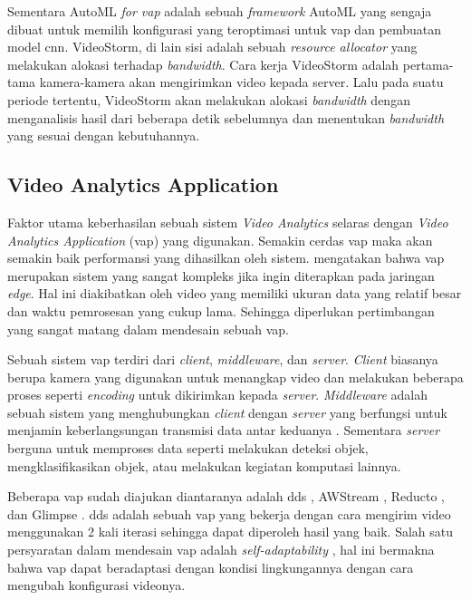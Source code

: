     Sementara AutoML \textit{for \gls{vap}} adalah sebuah \textit{framework} AutoML yang sengaja dibuat untuk memilih konfigurasi yang teroptimasi untuk \gls{vap} dan pembuatan model \gls{cnn}. VideoStorm, di lain sisi
    adalah sebuah \textit{resource allocator} yang melakukan alokasi terhadap \textit{bandwidth}. Cara kerja VideoStorm adalah pertama-tama kamera-kamera akan mengirimkan video kepada server.
    Lalu pada suatu periode tertentu, VideoStorm akan melakukan alokasi \textit{bandwidth} dengan menganalisis hasil dari beberapa detik sebelumnya dan menentukan \textit{bandwidth} yang sesuai dengan kebutuhannya.
    
    \subsection{Video Analytics Application}

    Faktor utama keberhasilan sebuah sistem \textit{Video Analytics} selaras dengan \textit{Video Analytics Application} (\gls{vap}) yang digunakan. Semakin cerdas \gls{vap}
    maka akan semakin baik performansi yang dihasilkan oleh sistem. \citep{killer} mengatakan bahwa \gls{vap} merupakan sistem yang sangat kompleks jika ingin diterapkan pada jaringan \textit{edge}.
    Hal ini diakibatkan oleh video yang memiliki ukuran data yang relatif besar dan waktu pemrosesan yang cukup lama. Sehingga diperlukan pertimbangan yang sangat matang dalam mendesain sebuah \gls{vap}.

    Sebuah sistem \gls{vap} terdiri dari \textit{client}, \textit{middleware}, dan \textit{server}. \textit{Client} biasanya berupa kamera yang digunakan untuk menangkap video dan melakukan beberapa proses seperti \textit{encoding}
    untuk dikirimkan kepada \textit{server}. \textit{Middleware} adalah sebuah sistem yang menghubungkan \textit{client} dengan \textit{server} yang berfungsi untuk menjamin keberlangsungan transmisi data antar keduanya \citep{middleware}.
    Sementara \textit{server} berguna untuk memproses data seperti melakukan deteksi objek, mengklasifikasikan objek, atau melakukan kegiatan komputasi lainnya.

    Beberapa \gls{vap} sudah diajukan diantaranya adalah \gls{dds} \citep{dds}, AWStream \citep{aws}, Reducto \citep{reducto}, dan Glimpse \citep{glimpse}.
    \gls{dds} adalah sebuah \gls{vap} yang bekerja dengan cara mengirim video menggunakan 2 kali iterasi sehingga dapat diperoleh hasil yang baik. Salah satu persyaratan dalam mendesain \gls{vap}
    adalah \textit{self-adaptability} \citep{chameleon}, hal ini bermakna bahwa \gls{vap} dapat beradaptasi dengan kondisi lingkungannya dengan cara mengubah konfigurasi videonya.

